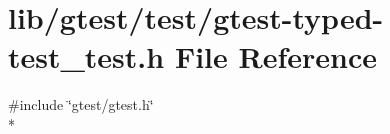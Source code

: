 \hypertarget{gtest-typed-test__test_8h}{\section{lib/gtest/test/gtest-\/typed-\/test\-\_\-test.h File Reference}
\label{gtest-typed-test__test_8h}
}
{\ttfamily \#include \char`\"{}gtest/gtest.\-h\char`\"{}}\\*
